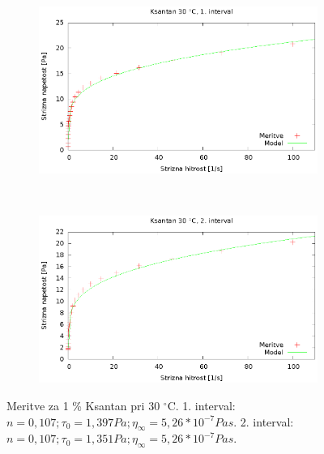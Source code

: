 \documentclass{article}
\begin{document}
\begin{figure}[H]
	\centering
	\begin{subfigure}[b]{0.45\textwidth}
	       \includegraphics[width=\textwidth]{tok_ksan3.eps}
	   \end{subfigure}
	   ~
	   \begin{subfigure}[b]{0.45\textwidth}
	       \includegraphics[width=\textwidth]{tok_ksan4.eps}
	   \end{subfigure}
	\caption{Meritve za 1 \% Ksantan pri 30 $^\circ$C. 1. interval: $n = 0,107; \tau_0 = 1,397 Pa; \eta_\infty = 5,26*10^{-7} Pa s$. 2. interval: $n = 0,107; \tau_0 = 1,351 Pa; \eta_\infty = 5,26*10^{-7} Pa s$.}
	\label{fig:tok_ksan2}
\end{figure}
\end{document}
